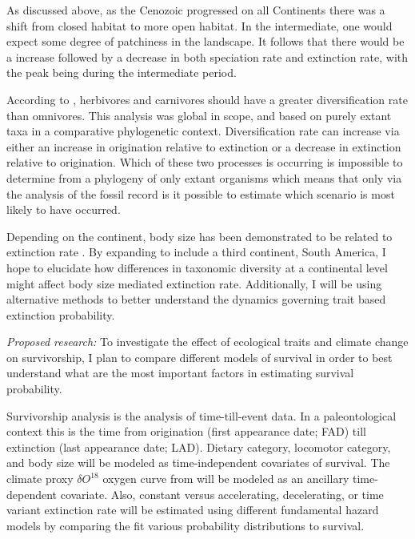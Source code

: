 \documentclass[12pt,letterpaper]{article}
\begin{document}

As discussed above, as the Cenozoic progressed on all Continents there was a shift from closed habitat to more open habitat. In the intermediate, one would expect some degree of patchiness in the landscape. It follows that there would be a increase followed by a decrease in both speciation rate and extinction rate, with the peak being during the intermediate period.

According to \citet{Price2012}, herbivores and carnivores should have a greater diversification rate than omnivores. This analysis was global in scope, and based on purely extant taxa in a comparative phylogenetic context. Diversification rate can increase via either an increase in origination relative to extinction or a decrease in extinction relative to origination. Which of these two processes is occurring is impossible to determine from a phylogeny of only extant organisms \citep{Rabosky2010a} which means that only via the analysis of the fossil record is it possible to estimate which scenario is most likely to have occurred. 

Depending on the continent, body size has been demonstrated to be related to extinction rate \citep{Tomiya2013,Liow2008,Liow2009}. By expanding to include a third continent, South America, I hope to elucidate how differences in taxonomic diversity at a continental level might affect body size mediated extinction rate. Additionally, I will be using alternative methods to better understand the dynamics governing trait based extinction probability.

\textit{Proposed research:}
To investigate the effect of ecological traits and climate change on survivorship, I plan to compare different models of survival in order to best understand what are the most important factors in estimating survival probability.

Survivorship analysis is the analysis of time-till-event data. In a paleontological context this is the time from origination (first appearance date; FAD) till extinction (last appearance date; LAD). Dietary category, locomotor category, and body size will be modeled as time-independent covariates of survival. The climate proxy \(\delta O^{18}\) oxygen curve from \citet{Zachos2008} will be modeled as an ancillary time-dependent covariate. Also, constant versus accelerating, decelerating, or time variant extinction rate will be estimated using different fundamental hazard models by comparing the fit various probability distributions to survival.
\end{document}
